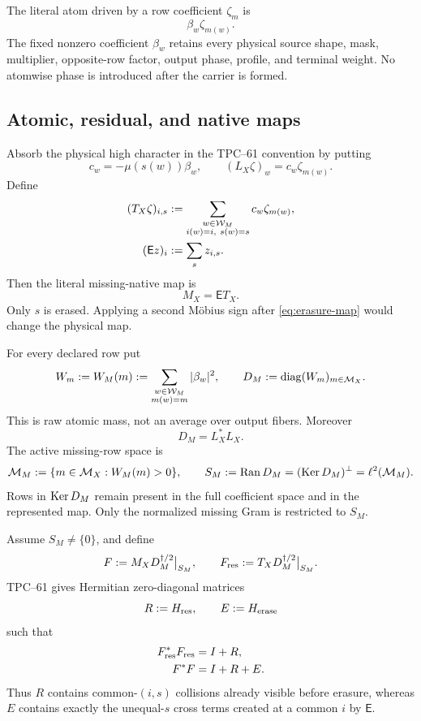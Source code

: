 The literal atom driven by a row coefficient \(\zeta_m\) is
\[
 \beta_w\zeta_{m(w)}.
\]
The fixed nonzero coefficient \(\beta_w\) retains every physical source
shape, mask, multiplier, opposite-row factor, output phase, profile, and
terminal weight.  No atomwise phase is introduced after the carrier is
formed.

\subsection{Atomic, residual, and native maps}

Absorb the physical high character in the TPC--61 convention by putting
\begin{equation}
 c_w=-\mu(s(w))\beta_w,\qquad
 (L_X\zeta)_w=c_w\zeta_{m(w)}.
 \label{eq:atomic-lift}
\end{equation}
Define
\begin{align}
 (T_X\zeta)_{i,s}
 &:=
 \sum_{\substack{w\in\mathcal W_M\\i(w)=i,\ s(w)=s}}
 c_w\zeta_{m(w)},
 \label{eq:residual-map}\\
 (\mathsf Ez)_i&:=\sum_s z_{i,s}.
 \label{eq:erasure-map}
\end{align}
Then the literal missing-native map is
\begin{equation}
 \boxed{M_X=\mathsf ET_X.}
 \label{eq:missing-native-factorization}
\end{equation}
Only \(s\) is erased.  Applying a second Möbius sign after
\eqref{eq:erasure-map} would change the physical map.

For every declared row put
\begin{equation}
 W_m:=W_M(m)
 :=
 \sum_{\substack{w\in\mathcal W_M\\m(w)=m}}|\beta_w|^2,
 \qquad
 D_M:=\operatorname{diag}(W_m)_{m\in\mathcal M_X}.
 \label{eq:raw-row-mass}
\end{equation}
This is raw atomic mass, not an average over output fibers.  Moreover
\[
 D_M=L_X^*L_X.
\]
The active missing-row space is
\begin{equation}
 \mathcal M_M:=\{m\in\mathcal M_X:W_M(m)>0\},
 \qquad
 S_M:=\operatorname{Ran} D_M=(\operatorname{Ker} D_M)^\perp
     =\ell^2(\mathcal M_M).
 \label{eq:active-row-space}
\end{equation}
Rows in \(\operatorname{Ker} D_M\) remain present in the full coefficient space and in
the represented map.  Only the normalized missing Gram is restricted to
\(S_M\).

Assume \(S_M\ne\{0\}\), and define
\begin{equation}
 F:=M_XD_M^{\dagger/2}\big|_{S_M},
 \qquad
 F_{\rm res}:=T_XD_M^{\dagger/2}\big|_{S_M}.
 \label{eq:normalized-incidences}
\end{equation}
TPC--61 gives Hermitian zero-diagonal matrices
\[
 R:=H_{\rm res},\qquad E:=H_{\rm erase}
\]
such that
\begin{align}
 F_{\rm res}^*F_{\rm res}&=I+R,
 \label{eq:residual-gram}\\
 F^*F&=I+R+E.
 \label{eq:native-gram}
\end{align}
Thus \(R\) contains common-\((i,s)\) collisions already visible before
erasure, whereas \(E\) contains exactly the unequal-\(s\) cross terms
created at a common \(i\) by \(\mathsf E\).

